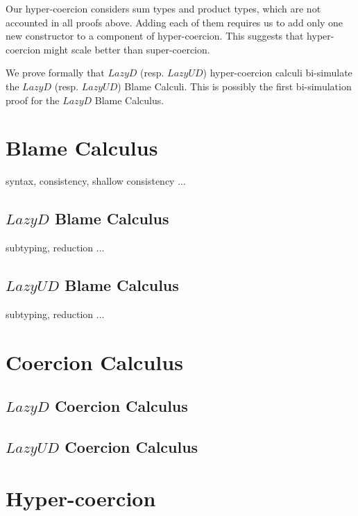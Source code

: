 \documentclass[acmsmall,review,anonymous]{acmart}\settopmatter{printfolios=true,printccs=false,printacmref=false}
\begin{document}
Our hyper-coercion considers sum types and product types, which are not 
accounted in all proofs above. Adding each of them requires us to add only one 
new constructor to a component of hyper-coercion. This suggests that 
hyper-coercion might scale better than super-coercion.

We prove formally that $ Lazy D $ (resp. $ Lazy UD $) hyper-coercion calculi 
bi-simulate the $ Lazy D $ (resp. $ Lazy UD $) Blame Calculi. This is possibly 
the first bi-simulation proof for the $ Lazy D $ Blame Calculus.

\section{Blame Calculus}

syntax, consistency, shallow consistency ...

\subsection{$Lazy D$ Blame Calculus}

subtyping, reduction ...

\subsection{$Lazy UD$ Blame Calculus}

subtyping, reduction ...

\section{Coercion Calculus}

\subsection{$Lazy D$ Coercion Calculus}

\subsection{$Lazy UD$ Coercion Calculus}

\section{Hyper-coercion}
\end{document}
